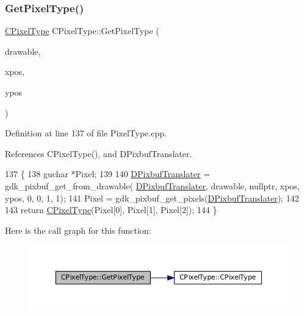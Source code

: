 \subsubsection{\texorpdfstring{Get\+Pixel\+Type()}{GetPixelType()}\hspace{0.1cm}{\footnotesize\ttfamily [2/2]}}
{\footnotesize\ttfamily \hyperlink{classCPixelType}{C\+Pixel\+Type} C\+Pixel\+Type\+::\+Get\+Pixel\+Type (\begin{DoxyParamCaption}\item[{Gdk\+Drawable $\ast$}]{drawable,  }\item[{gint}]{xpos,  }\item[{gint}]{ypos }\end{DoxyParamCaption})\hspace{0.3cm}{\ttfamily [static]}}



Definition at line 137 of file Pixel\+Type.\+cpp.



References C\+Pixel\+Type(), and D\+Pixbuf\+Translater.


\begin{DoxyCode}
137                                                                               \{
138     guchar *Pixel;
139     
140     \hyperlink{classCPixelType_af1243e70d11325b487a215ae190db0a2}{DPixbufTranslater} = gdk\_pixbuf\_get\_from\_drawable(
      \hyperlink{classCPixelType_af1243e70d11325b487a215ae190db0a2}{DPixbufTranslater}, drawable, \textcolor{keyword}{nullptr}, xpos, ypos, 0, 0, 1, 1);
141     Pixel = gdk\_pixbuf\_get\_pixels(\hyperlink{classCPixelType_af1243e70d11325b487a215ae190db0a2}{DPixbufTranslater});
142     
143     \textcolor{keywordflow}{return} \hyperlink{classCPixelType_a393381dca7114d6279bcee1e5f280e4b}{CPixelType}(Pixel[0], Pixel[1], Pixel[2]);
144 \}
\end{DoxyCode}
Here is the call graph for this function\+:\nopagebreak
\begin{figure}[H]
\begin{center}
\leavevmode
\includegraphics[width=350pt]{classCPixelType_a91ab76ebf6c87934a8738018686746d4_cgraph}
\end{center}
\end{figure}
\hypertarget{classCPixelType_a3bcba5fcc9d9cb0a2504f6f3d913c175}{}\label{classCPixelType_a3bcba5fcc9d9cb0a2504f6f3d913c175} 
